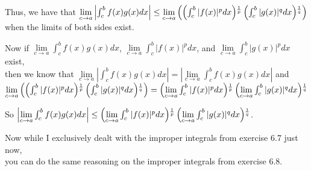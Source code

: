 \documentclass{book}
\newenvironment{myIndent}{%
   \begin{adjustwidth}{2.5em}{0em}%
}{%
   \end{adjustwidth}%
}
\newcommand{\retTwo}{\hfill\bigbreak}
\begin{document}
\begin{itemize}
{\begin{myIndent}
      Thus, we have that $\lim\limits_{c\rightarrow a}\left|\int_c^b f(x)g(x)dx\right| \leq \lim\limits_{c\rightarrow a}\left(\left(\int_c^b|f(x)|^p dx\right)\hspace{-0.2em}\vphantom{b}^{\frac{1}{p}}\left(\int_c^b|g(x)|^q dx\right)\hspace{-0.2em}\vphantom{b}^{\frac{1}{q}}\right)$\\ when the limits of both sides exist.\retTwo

      Now if $\lim\limits_{c\rightarrow a}\int_c^b f(x)g(x)dx$,   $\lim\limits_{c\rightarrow a}\int_c^b|f(x)|^p dx$, and $\lim\limits_{c\rightarrow a}\int_c^b|g(x)|^p dx$ exist,\\ then we know that $\lim\limits_{c\rightarrow a}\left|\int_c^b f(x)g(x)dx\right| = \left|\lim\limits_{c\rightarrow a}\int_c^b f(x)g(x)dx\right|$ and\\ 
      {\fontsize{12}{14}$\lim\limits_{c\rightarrow a}\left(\left(\int_c^b|f(x)|^p dx\right)\hspace{-0.2em}\vphantom{b}^{\frac{1}{p}}\left(\int_c^b|g(x)|^q dx\right)\hspace{-0.2em}\vphantom{b}^{\frac{1}{q}}\right) = \left(\lim\limits_{c\rightarrow a}\int_c^b|f(x)|^p dx\right)\hspace{-0.2em}\vphantom{b}^{\frac{1}{p}}\left(\lim\limits_{c\rightarrow a}\int_c^b|g(x)|^q dx\right)\hspace{-0.2em}\vphantom{b}^{\frac{1}{q}}$}\retTwo

      So $\left|\lim\limits_{c\rightarrow a}\int_c^b f(x)g(x)dx\right| \leq \left(\lim\limits_{c\rightarrow a}\int_c^b|f(x)|^p dx\right)\hspace{-0.2em}\vphantom{b}^{\frac{1}{p}}\left(\lim\limits_{c\rightarrow a}\int_c^b|g(x)|^q dx\right)\hspace{-0.2em}\vphantom{b}^{\frac{1}{q}}$.\retTwo

      Now while I exclusively dealt with the improper integrals from exercise 6.7 just now,\\ you can do the same reasoning on the improper integrals from exercise 6.8.

   \end{myIndent}}
\end{itemize}

\newpage
\end{document}

